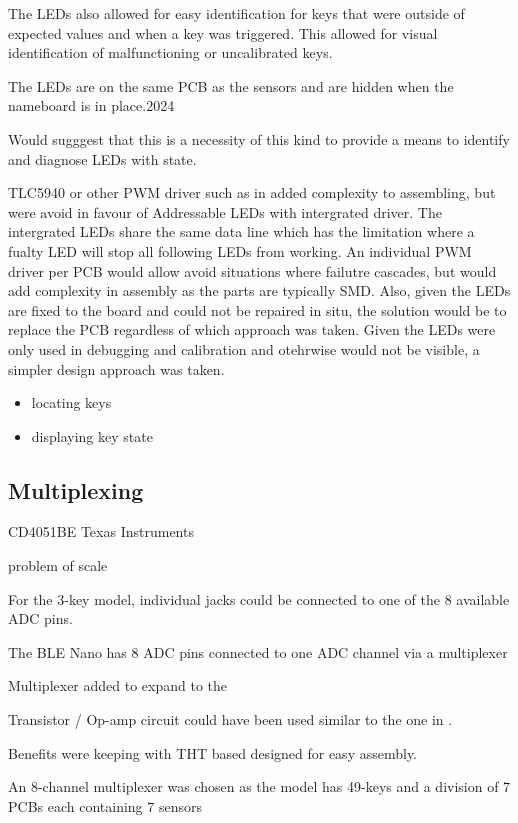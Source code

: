 The LEDs also allowed for easy identification for keys that were outside
of expected values and when a key was triggered. This allowed for visual
identification of malfunctioning or uncalibrated keys.

The LEDs are on the same PCB as the sensors and are hidden when the
nameboard is in place.2024

Would sugggest that this is a necessity of this kind to provide a means
to identify and diagnose LEDs with state.

TLC5940 or other PWM driver such as in \cite{McPherson2013} added
complexity to assembling, but were avoid in favour of Addressable LEDs
with intergrated driver. The intergrated LEDs share the same data line
which has the limitation where a fualty LED will stop all following LEDs
from working. An individual PWM driver per PCB would allow avoid
situations where failutre cascades, but would add complexity in assembly
as the parts are typically SMD. Also, given the LEDs are fixed to the
board and could not be repaired in situ, the solution would be to
replace the PCB regardless of which approach was taken. Given the LEDs
were only used in debugging and calibration and otehrwise would not be
visible, a simpler design approach was taken.

\begin{itemize}
\item
  locating keys
\item
  displaying key state
\end{itemize}

\subsection{Multiplexing}\label{multiplexing}

CD4051BE Texas Instruments

problem of scale

For the 3-key model, individual jacks could be connected to one of the 8
available ADC pins.

The BLE Nano has 8 ADC pins connected to one ADC channel via a
multiplexer

Multiplexer added to expand to the

Transistor / Op-amp circuit could have been used similar to the one in
\cite{McPherson2013}.

Benefits were keeping with THT based designed for easy assembly.

An 8-channel multiplexer was chosen as the model has 49-keys and a
division of 7 PCBs each containing 7 sensors


